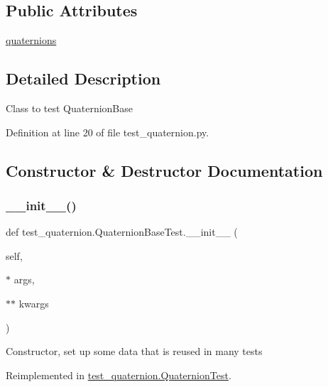 \subsection*{Public Attributes}
\begin{DoxyCompactItemize}
\item 
\mbox{\hyperlink{classtest__quaternion_1_1QuaternionBaseTest_a9b22d9bab76b02085f9a89f7dec55cc5}{quaternions}}
\end{DoxyCompactItemize}


\subsection{Detailed Description}
\begin{DoxyVerb}Class to test QuaternionBase
\end{DoxyVerb}
 

Definition at line 20 of file test\+\_\+quaternion.\+py.



\subsection{Constructor \& Destructor Documentation}
\mbox{\label{classtest__quaternion_1_1QuaternionBaseTest_a171a0ff5c571de3b9433e5e00799f467}} 
\subsubsection{\texorpdfstring{\_\_init\_\_()}{\_\_init\_\_()}}
{\footnotesize\ttfamily def test\+\_\+quaternion.\+Quaternion\+Base\+Test.\+\_\+\+\_\+init\+\_\+\+\_\+ (\begin{DoxyParamCaption}\item[{}]{self,  }\item[{$\ast$}]{args,  }\item[{$\ast$$\ast$}]{kwargs }\end{DoxyParamCaption})}

\begin{DoxyVerb}Constructor, set up some data that is reused in many tests\end{DoxyVerb}
 

Reimplemented in \mbox{\hyperlink{classtest__quaternion_1_1QuaternionTest_a4212d313a1824e188d86a81498483219}{test\+\_\+quaternion.\+Quaternion\+Test}}.



